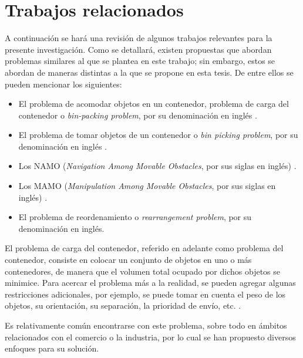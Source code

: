 \chapter{Trabajos relacionados}
\label{chap:trabajos_relacionados}
%
%
A continuación se hará una revisión de algunos trabajos relevantes para la presente investigación.
Como se detallará, existen propuestas que abordan problemas similares al que se plantea en este trabajo; sin embargo, estos se abordan de maneras distintas a la que se propone en esta tesis.
De entre ellos se pueden mencionar los siguientes: 
%
\begin{itemize}
	\item El problema de acomodar objetos en un contenedor, problema de carga del contenedor o \textit{bin-packing problem}, por su denominación en inglés \cite{doi:10.1287/opre.48.2.256.12386}\cite{10.5555/98124}.
	\item El problema de tomar objetos de un contenedor o \textit{bin picking problem}, por su denominación en inglés \cite{1699272}.
	\item Los NAMO (\textit{Navigation Among Movable Obstacles}, por sus siglas en inglés) \cite{doi:10.1142/S0219843605000545}.
	\item Los MAMO (\textit{Manipulation Among Movable Obstacles}, por sus siglas en inglés) \cite{4209604}.
	\item El problema de reordenamiento o \textit{rearrangement problem}, por su denominación en inglés.
\end{itemize}
%
%
%
%
El problema de carga del contenedor, referido en adelante como problema del contenedor, consiste en colocar un conjunto de objetos en uno o más contenedores, de manera que el volumen total ocupado por dichos objetos se minimice.
Para acercar el problema más a la realidad, se pueden agregar algunas restricciones adicionales, por ejemplo, se puede tomar en cuenta el peso de los objetos, su orientación, su separación, la prioridad de envío, etc. \cite{BISCHOFF1995377}.

Es relativamente común encontrarse con este problema, sobre todo en ámbitos relacionados con el comercio o la industria, por lo cual se han propuesto diversos enfoques para su solución.


